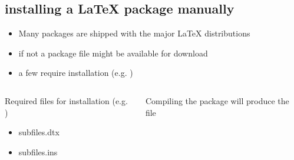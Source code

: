 \subsection{installing a {\LaTeX} package manually}
\label{installing-a-latex-package}
\begin{frame}
	\begin{itemize}
		\item Many packages are shipped with the major {\LaTeX} distributions
		\item if not a  package file might be available for
			download
		\item a few require installation (e.g. )
	\end{itemize}
	
	\begin{columns}[c]
		\begin{block}{Required files for installation (e.g. )}
			\begin{itemize}
				\item subfiles.dtx \item subfiles.ins
			\end{itemize}
		\end{block}
		\begin{block}{Compiling the package}
			will produce the file 
		\end{block}
	\end{columns}
\end{frame}

